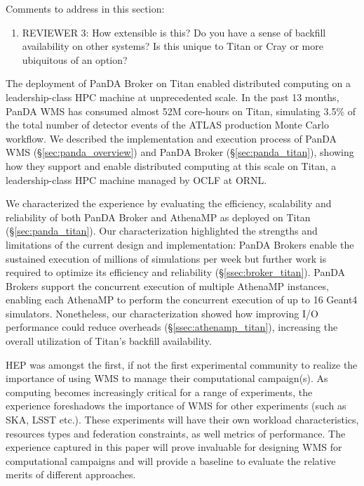 \ifreview
Comments to address in this section:
\begin{enumerate}
	\item REVIEWER 3: How extensible is this? Do you have a sense of backfill
	availability on other systems? Is this unique to Titan or Cray or more
	ubiquitous of an option?
\end{enumerate}
\fi

The deployment of PanDA Broker on Titan enabled distributed computing on a
leadership-class HPC machine at unprecedented scale. In the past 13 months,
PanDA WMS has consumed almost 52M core-hours on Titan, simulating 3.5\% of
the total number of detector events of the ATLAS production Monte Carlo
workflow. We described the implementation and execution process of PanDA WMS
(\S\ref{sec:panda_overview}) and PanDA Broker (\S\ref{sec:panda_titan}),
showing how they support and enable distributed computing at this scale on
Titan, a leadership-class HPC machine managed by OCLF at ORNL.

We characterized the experience by evaluating the efficiency, scalability and
reliability of both PanDA Broker and AthenaMP as deployed on Titan
(\S\ref{sec:panda_titan}). Our characterization highlighted the strengths and
limitations of the current design and implementation: PanDA Brokers enable
the sustained execution of millions of simulations per week but further work
is required to optimize its efficiency and reliability
(\S\ref{ssec:broker_titan}). PanDA Brokers support the concurrent execution
of multiple AthenaMP instances, enabling each AthenaMP to perform the
concurrent execution of up to 16 Geant4 simulators. Nonetheless, our
characterization showed how improving I/O performance could reduce overheads
(\S\ref{ssec:athenamp_titan}), increasing the overall utilization of Titan's
backfill availability.


HEP was amongst the first, if not the first experimental community to realize
the importance of using WMS to manage their computational campaign(s). As
computing becomes increasingly critical for a range of experiments, the
experience foreshadows the importance of WMS for other experiments (such as
SKA, LSST etc.).  These experiments will have their own workload
characteristics, resources types and federation constraints, as well metrics
of performance. The experience captured in this paper will prove invaluable
for designing WMS for computational campaigns and will provide a baseline to
evaluate the relative merits of different approaches.

